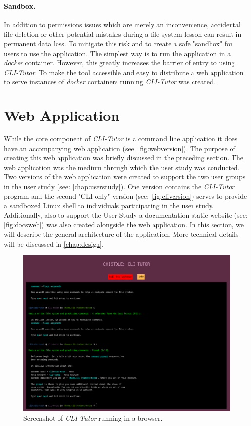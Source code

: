 \paragraph{Sandbox.} In addition to permissions issues which are merely an
inconvenience, accidental file deletion or other potential mistakes during a
file system lesson can result in permanent data loss. To mitigate this risk and
to create a safe "sandbox" for users to use the application. The simplest
way is to run the application in a \textit{docker}\cite{dockerinc_2022}
container. However, this greatly increases the barrier of entry to using
\textit{CLI-Tutor}. To make the tool accessible and easy to distribute
a web application to serve instances of \textit{docker} containers running
\textit{CLI-Tutor} was created.

\section{Web Application}

While the core component of \textit{CLI-Tutor} is a command line application it
does have an accompanying web application (see: \autoref{fig:webversion}). The
purpose of creating this web application was briefly discussed in the preceding
section. The web application was the medium through which the user study was
conducted. Two versions of the web application were created to support the two
user groups in the user study (see: \autoref{chap:userstudy}). One version
contains the \textit{CLI-Tutor} program and the second "CLI only" version (see: \autoref{fig:cliversion})
serves to provide a sandboxed Linux shell to individuals participating in the
user study. Additionally, also to support the User Study a documentation static
website (see: \autoref{fig:docsweb}) was also created alongside the web application. In this section, we
will describe the general architecture of the application. More technical
details will be discussed in \autoref{chap:design}.


\begin{figure}[htbp]
	\centering
	\includegraphics[width=1\textwidth]{img/cliwebshort}
	\caption{Screenshot of \textit{CLI-Tutor} running in a browser.}
	\label{fig:webversion}
\end{figure}


